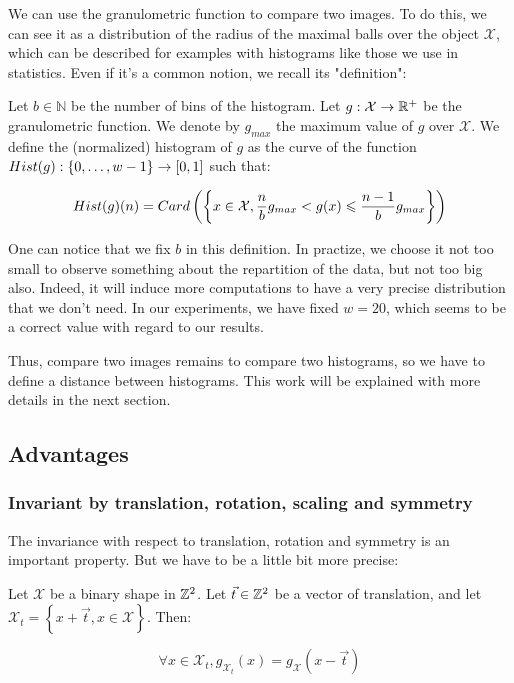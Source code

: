 We can use the granulometric function to compare two images. To do this, we can see it as a distribution of the radius of the maximal balls over the object $\mathcal{X}$, which can be described for examples with histograms like those we use in statistics. Even if it's a common notion, we recall its "definition":

\begin{definition}
	Let $b \in \mathbb{N}$ be the number of bins of the histogram. Let $g: \mathcal{X} \to \mathbb{R}^+$ be the granulometric function. We denote by $g_{max}$ the maximum value of $g$ over $\mathcal{X}$. We define the (normalized) histogram of $g$ as the curve of the function $Hist(g): \left\{ 0,\dots,w-1 \right\} \to \left[0,1\right]$ such that:

\[
	Hist(g)(n) = Card \left( \left\{  x \in \mathcal{X}, \frac{n}{b}g_{max} < g(x) \leqslant \frac{n-1}{b}g_{max} \right\} \right)
\]
\end{definition}

One can notice that we fix $b$ in this definition. In practize, we choose it not too small to observe something about the repartition of the data, but not too big also. Indeed, it will induce more computations to have a very precise distribution that we don't need. In our experiments, we have fixed $w = 20$, which seems to be a correct value with regard to our results.

Thus, compare two images remains to compare two histograms, so we have to define a distance between histograms. This work will be explained with more details in the next section.

\subsection{Advantages}

\subsubsection{Invariant by translation, rotation, scaling and symmetry}

The invariance with respect to translation, rotation and symmetry is an important property. But we have to be a little bit more precise:

\begin{theoreme}
	Let $\mathcal{X}$ be a binary shape in $\mathbb{Z}^{2}$. Let $\vec{t} \in \mathbb{Z}^{2}$ be a vector of translation, and let $\mathcal{X}_{t} = \left\{ x + \vec{t}, x \in \mathcal{X} \right\}$. Then:
	
	$$ \forall x \in \mathcal{X}_{t}, g_{\mathcal{X}_{t}}(x) = g_{\mathcal{X}}(x-\vec{t}) $$
\end{theoreme}

